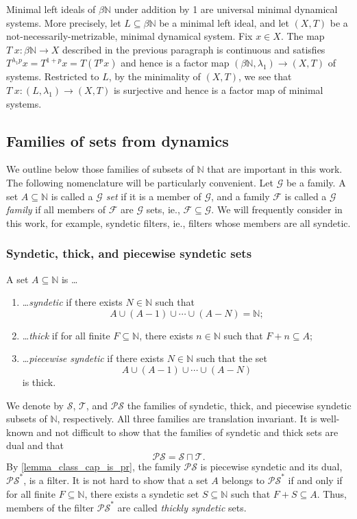 \documentclass[letter,11pt]{article}
\theoremstyle{plain}
\theoremstyle{definition}
\theoremstyle{plain}
\theoremstyle{plain}
\numberwithin{equation}{section}
\newcommand{\N}{\mathbb{N}}
\newcommand{\syndetic}{\mathcal{S}}
\newcommand{\thick}{\mathcal{T}}
\newcommand{\PS}{\mathcal{PS}}
\newcommand{\classcap}{\sqcap}
\newcommand{\familyone}{\mathscr{F}}
\newcommand{\familytwo}{\mathscr{G}}
\begin{document}
Minimal left ideals of $\beta \N$ under addition by 1 are universal minimal dynamical systems.  More precisely, let $L \subseteq \beta \N$ be a minimal left ideal, and let $(X,T)$ be a not-necessarily-metrizable, minimal dynamical system.  Fix $x \in X$.  The map $T^{\displaystyle \cdot} x: \beta \N \to X$ described in the previous paragraph is continuous and satisfies $T^{\lambda_1 p} x = T^{1 + p} x = T (T^p x)$ and hence is a factor map $(\beta \N,\lambda_1) \to (X,T)$ of systems.  Restricted to $L$, by the minimality of $(X,T)$, we see that $T^{\displaystyle \cdot} x: (L, \lambda_1) \to (X,T)$ is surjective and hence is a factor map of minimal systems.


\subsection{Families of sets from dynamics}
\label{sec_families_of_sets}

We outline below those families of subsets of $\N$ that are important in this work.  The following nomenclature will be particularly convenient.  Let $\familytwo$ be a family. A set $A \subseteq \N$ is called a \emph{$\familytwo$ set} if it is a member of $\familytwo$, and a family $\familyone$ is called a \emph{$\familytwo$ family} if all members of $\familyone$ are $\familytwo$ sets, ie., $\familyone \subseteq \familytwo$. We will frequently consider in this work, for example, syndetic filters, ie., filters whose members are all syndetic.

\subsubsection{Syndetic, thick, and piecewise syndetic sets}
\label{sec_syndetic_thick_ps_sets}

A set $A \subseteq \N$ is \dots
\begin{enumerate}
    \item \dots \emph{syndetic} if there exists $N \in \N$ such that
    \[
        A \cup (A-1) \cup \cdots \cup (A-N) = \N;
    \]

    \item \dots \emph{thick} if for all finite $F \subseteq \N$, there exists $n \in \N$ such that $F + n \subseteq A$;

    \item \dots \emph{piecewise syndetic} if there exists $N \in \N$ such that the set
    \[A \cup (A-1) \cup \cdots \cup (A-N)\]
    is thick.
\end{enumerate}
We denote by $\syndetic$, $\thick$, and $\PS$ the families of syndetic, thick, and piecewise syndetic subsets of $\N$, respectively. All three families are translation invariant. It is well-known and not difficult to show that the families of syndetic and thick sets are dual and that
\[\PS = \syndetic \classcap \thick.\]
By \cref{lemma_class_cap_is_pr}, the family $\PS$ is piecewise syndetic and its dual, $\PS^*$, is a filter. It is not hard to show that a set $A$ belongs to $\PS^*$ if and only if for all finite $F \subseteq \N$, there exists a syndetic set $S \subseteq \N$ such that $F + S \subseteq A$.  Thus, members of the filter $\PS^*$ are called \emph{thickly syndetic} sets.
\end{document}
